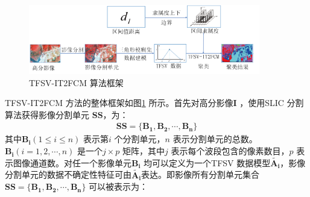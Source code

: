 \begin{figure}[!h]
    \centering
    \includegraphics[width=0.9\textwidth]{figures/tfsvit2fcm}
    \caption{TFSV-IT2FCM 算法框架}
    \label{fig:tfsvit2fcm}
\end{figure}

TFSV-IT2FCM 方法的整体框架如图\ref{fig:tfsvit2fcm} 所示。首先对高分影像$\bm{I}$ ，使用SLIC 分割算法获得影像分割单元 $\bm{SS}$，为：
\begin{equation}\label{eq:image_ss}
    \begin{split}
        \bm{SS} = \lbrace \bm{B_1}, \bm{B_2},\bm{\cdots}, \bm{B_n} \rbrace
    \end{split}
\end{equation}
其中$\bm{B_i}(1 \leq i \leq n)$ 表示第$i$ 个分割单元，$n$ 表示分割单元的总数。 $\bm{B_i}(i=1,2,\cdots, n)$ 是一个$j \times p$ 矩阵，其中$j$ 表示每个波段包含的像素数目，$p$ 表示图像通道数。对任一个影像单元$\bm{B_i}$ 均可以定义为一个TFSV 数据模型$\bm{\tilde{A_i}}$，影像分割单元的数据不确定性特征可由$\bm{\tilde{A_i}}$表达。即影像所有分割单元集合$\bm{SS} = \lbrace \bm{B_1}, \bm{B_2},\bm{\cdots}, \bm{B_n} \rbrace$ 可以被表示为：

